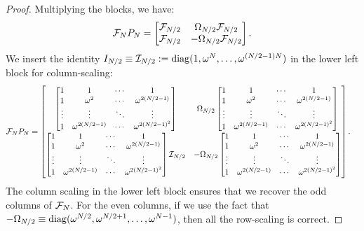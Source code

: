 \begin{proof}
Multiplying the blocks, we have:
\begin{equation}
\mathcal{F}_NP_N = 
\begin{bmatrix}
\mathcal{F}_{N/2} & \Omega_{N/2}\mathcal{F}_{N/2}\\
\mathcal{F}_{N/2} & -\Omega_{N/2}\mathcal{F}_{N/2}\\
\end{bmatrix}.
\end{equation}
We insert the identity $I_{N/2} \equiv {\cal I}_{N/2} := \operatorname{diag}(1,\omega^N,\ldots,\omega^{(N/2-1)N})$ in the lower left block for column-scaling:
\begin{align}
\mathcal{F}_NP_N & =
\begin{bmatrix}
\begin{bmatrix}
1 & 1 & \cdots & 1\\
1 & \omega^2 & \cdots & \omega^{2(N/2-1)}\\
\vdots & \vdots & \ddots & \vdots\\
1 & \omega^{2(N/2-1)} & \cdots & \omega^{2(N/2-1)^2}
\end{bmatrix}
& \Omega_{N/2}\begin{bmatrix}
1 & 1 & \cdots & 1\\
1 & \omega^2 & \cdots & \omega^{2(N/2-1)}\\
\vdots & \vdots & \ddots & \vdots\\
1 & \omega^{2(N/2-1)} & \cdots & \omega^{2(N/2-1)^2}
\end{bmatrix}\\
\begin{bmatrix}
1 & 1 & \cdots & 1\\
1 & \omega^2 & \cdots & \omega^{2(N/2-1)}\\
\vdots & \vdots & \ddots & \vdots\\
1 & \omega^{2(N/2-1)} & \cdots & \omega^{2(N/2-1)^2}
\end{bmatrix}{\cal I}_{N/2}
& -\Omega_{N/2}\begin{bmatrix}
1 & 1 & \cdots & 1\\
1 & \omega^2 & \cdots & \omega^{2(N/2-1)}\\
\vdots & \vdots & \ddots & \vdots\\
1 & \omega^{2(N/2-1)} & \cdots & \omega^{2(N/2-1)^2}
\end{bmatrix}\\
\end{bmatrix}.
\end{align}
The column scaling in the lower left block ensures that we recover the odd columns of $\mathcal{F}_N$. For the even columns, if we use the fact that $-\Omega_{N/2} \equiv \operatorname{diag}(\omega^{N/2},\omega^{N/2+1},\ldots,\omega^{N-1})$, then all the row-scaling is correct.
\end{proof}

